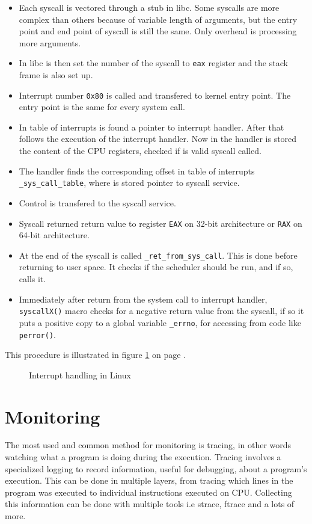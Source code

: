 \begin{itemize}
	\item Each syscall is vectored through a stub in libc. Some syscalls are more complex than others because of variable length of arguments, but the entry point and end point of syscall is still the same. Only overhead is processing more arguments.
	\item In libc is then set the number of the syscall to \texttt{eax} register and the stack frame is also set up.
	\item Interrupt number \texttt{0x80} is called and transfered to kernel entry point. The entry point is the same for every system call.
	\item In table of interrupts is found a pointer to interrupt handler. After that follows the execution of the interrupt handler. Now in the handler is stored the content of the CPU registers, checked if is valid syscall called.
	\item The handler finds the corresponding offset in table of interrupts \texttt{\_sys\_call\_table}, where is stored pointer to syscall service.
	\item Control is transfered to the syscall service.
	\item Syscall returned return value to register \texttt{EAX} on 32-bit architecture or \texttt{RAX} on 64-bit architecture.
	\item At the end of the syscall is called \texttt{\_ret\_from\_sys\_call\(\)}. This is done before returning to user space. It checks if the scheduler should be run, and if so, calls it.
	\item Immediately after return from the system call to interrupt handler, \texttt{syscallX()} macro checks for a negative return value from the syscall, if so it puts a positive copy to a global variable \texttt{\_errno}, for accessing from code like \texttt{perror()}.
\end{itemize}

This procedure is illustrated in figure \ref{fig:tikz:int_handling} on page \pageref{fig:tikz:int_handling}.

\begin{figure}[]
  \centering
  
  \caption{Interrupt handling in Linux}
  \label{fig:tikz:int_handling}
\end{figure}


\section{Monitoring}
The most used and common method for monitoring is tracing, in other words watching what a program is doing during the execution.
Tracing involves a specialized logging to record information, useful for debugging, about a program's execution.
This can be done in multiple layers, from tracing which lines in the program was executed to individual instructions executed on CPU.
Collecting this information can be done with multiple tools i.e strace, ftrace and a lots of more.


